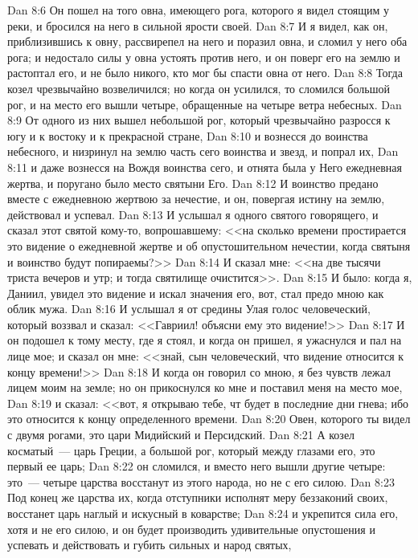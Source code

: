 \vs Dan 8:6 Он пошел на того овна, имеющего рога, которого я видел стоящим у реки, и бросился на него в сильной ярости своей.
\vs Dan 8:7 И я видел, как он, приблизившись к овну, рассвирепел на него и поразил овна, и сломил у него оба рога; и недостало силы у овна устоять против него, и он поверг его на землю и растоптал его, и не было никого, кто мог бы спасти овна от него.
\vs Dan 8:8 Тогда козел чрезвычайно возвеличился; но когда он усилился, то сломился большой рог, и на место его вышли четыре, обращенные на четыре ветра небесных.
\vs Dan 8:9 От одного из них вышел небольшой рог, который чрезвычайно разросся к югу и к востоку и к прекрасной стране,
\vs Dan 8:10 и вознесся до воинства небесного, и низринул на землю часть сего воинства и звезд, и попрал их,
\vs Dan 8:11 и даже вознесся на Вождя воинства сего, и отнята была у Него ежедневная жертва, и поругано было место святыни Его.
\vs Dan 8:12 И воинство предано вместе с ежедневною жертвою за нечестие, и он, повергая истину на землю, действовал и успевал.
\vs Dan 8:13 И услышал я одного святого говорящего, и сказал этот святой кому-то, вопрошавшему: <<на сколько времени простирается это видение о ежедневной жертве и об опустошительном нечестии, когда святыня и воинство будут попираемы?>>
\vs Dan 8:14 И сказал мне: <<на две тысячи триста вечеров и утр; и тогда святилище очистится>>.
\vs Dan 8:15 И было: когда я, Даниил, увидел это видение и искал значения его, вот, стал предо мною как облик мужа.
\vs Dan 8:16 И услышал я от средины Улая голос человеческий, который воззвал и сказал: <<Гавриил! объясни ему это видение!>>
\vs Dan 8:17 И он подошел к тому месту, где я стоял, и когда он пришел, я ужаснулся и пал на лице мое; и сказал он мне: <<знай, сын человеческий, что видение относится к концу времени!>>
\vs Dan 8:18 И когда он говорил со мною, я без чувств лежал лицем моим на земле; но он прикоснулся ко мне и поставил меня на место мое,
\vs Dan 8:19 и сказал: <<вот, я открываю тебе, чт будет в последние дни гнева; ибо это относится к концу определенного времени.
\vs Dan 8:20 Овен, которого ты видел с двумя рогами, это цари Мидийский и Персидский.
\vs Dan 8:21 А козел косматый~--- царь Греции, а большой рог, который между глазами его, это первый ее царь;
\vs Dan 8:22 он сломился, и вместо него вышли другие четыре: это~--- четыре царства восстанут из этого народа, но не с его силою.
\vs Dan 8:23 Под конец же царства их, когда отступники исполнят меру беззаконий своих, восстанет царь наглый и искусный в коварстве;
\vs Dan 8:24 и укрепится сила его, хотя и не его силою, и он будет производить удивительные опустошения и успевать и действовать и губить сильных и народ святых,
